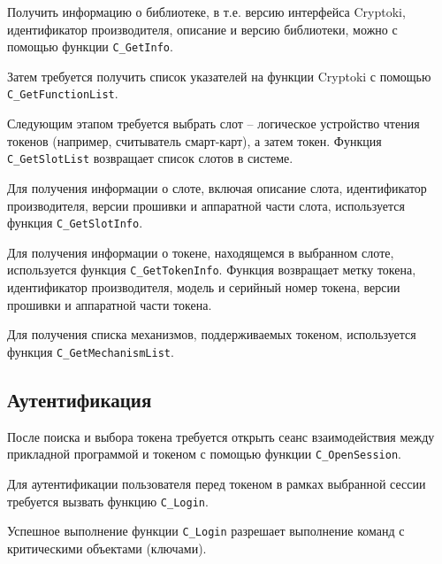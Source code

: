 Получить информацию о библиотеке, в т.е. версию интерфейса
Cryptoki, идентификатор производителя, описание и версию
библиотеки, можно с помощью функции \verb|C_GetInfo|.

Затем требуется получить список указателей на функции Cryptoki
с помощью \verb|C_GetFunctionList|.

Следующим этапом требуется выбрать слот -- логическое
устройство чтения токенов (например, считыватель смарт-карт),
а затем токен.
Функция \verb|C_GetSlotList| возвращает список слотов в системе.

Для получения информации о слоте, включая описание слота,
идентификатор производителя, версии прошивки и аппаратной
части слота, используется функция \verb|C_GetSlotInfo|.

Для получения информации о токене, находящемся в выбранном
слоте, используется функция \verb|C_GetTokenInfo|.
Функция возвращает метку токена, идентификатор производителя,
модель и серийный номер токена, версии прошивки и
аппаратной части токена.

Для получения списка механизмов, поддерживаемых токеном,
используется функция \verb|C_GetMechanismList|.


\subsection{Аутентификация}

После поиска и выбора токена требуется открыть сеанс
взаимодействия между прикладной программой и токеном с
помощью функции \verb|C_OpenSession|.

Для аутентификации пользователя перед токеном в рамках
выбранной сессии требуется вызвать функцию \verb|C_Login|.

Успешное выполнение функции \verb|C_Login| разрешает
выполнение команд с критическими объектами (ключами).

